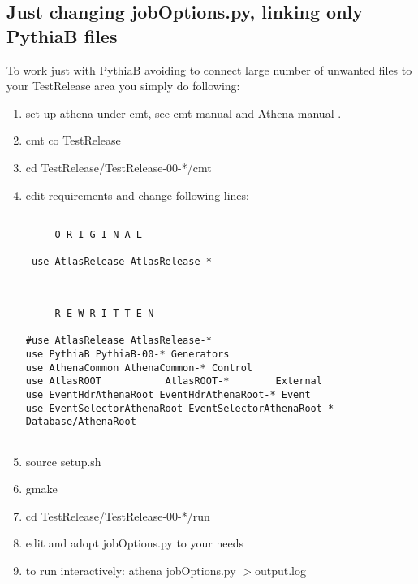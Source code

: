 \subsection{Just changing jobOptions.py, linking only PythiaB files}


To work just with PythiaB avoiding to connect large number of
 unwanted files to your
TestRelease area      you simply do following:


\begin{enumerate}

\vspace{-3mm}\item set up athena under cmt,  see cmt manual
\cite{cmt} and Athena manual \cite{athena}.
\vspace{3mm}\item cmt co TestRelease 
\vspace{-3mm} \item cd TestRelease/TestRelease-00-*/cmt
\vspace{-3mm} \item edit requirements
and change following lines:

\begin{verbatim}

     O R I G I N A L 
  
 use AtlasRelease AtlasRelease-* 
  
\end{verbatim}

\begin{verbatim}

     R E W R I T T E N 
  
#use AtlasRelease AtlasRelease-*
use PythiaB PythiaB-00-* Generators
use AthenaCommon AthenaCommon-* Control
use AtlasROOT           AtlasROOT-*        External  
use EventHdrAthenaRoot EventHdrAthenaRoot-* Event
use EventSelectorAthenaRoot EventSelectorAthenaRoot-* Database/AthenaRoot


\end{verbatim}

 \vspace{-3mm} \item  source setup.sh 
\vspace{-3mm}\item  gmake
\vspace{-3mm} \item  cd TestRelease/TestRelease-00-*/run
\vspace{-3mm} \item  edit and adopt jobOptions.py to your needs
 \vspace{-3mm}\item  to run interactively: athena jobOptions.py $>$output.log
\end{enumerate}








